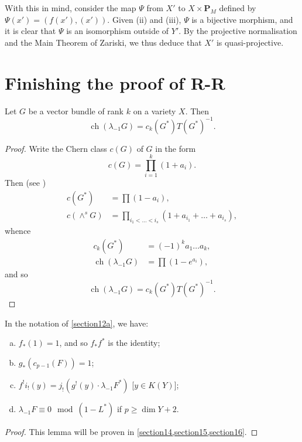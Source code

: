 \documentclass{article}
\theoremstyle{plain}
\newenvironment{lemma}[1]
    {\renewcommand\theinnercustomlemma{#1}\innercustomlemma}
    {\endinnercustomlemma}
\theoremstyle{definition}
\newcommand{\PP}{\mathbf{P}}
\renewcommand{\geq}{\geqslant}
\DeclareMathOperator{\ch}{ch}
\begin{document}
With this in mind, consider the map $\Psi$ from $X'$ to $X\times\PP_M$ defined by $\Psi(x')=(f(x'),(x'))$.
Given (ii) and (iii), $\Psi$ is a bijective morphism, and it is clear that $\Psi$ is an isomorphism outside of $Y'$.
By the projective normalisation and the Main Theorem of Zariski, we thus deduce that $X'$ is quasi-projective.


\section{Finishing the proof of R-R}
\label{section13}

\begin{lemma}{18}
\label{lemma18}
  Let $G$ be a vector bundle of rank $k$ on a variety $X$.
  Then
  \[
    \ch(\lambda_{-1}G) = c_k(G^*)T(G^*)^{-1}.
  \]
\end{lemma}

\begin{proof}
  Write the Chern class $c(G)$ of $G$ in the form
  \[
    c(G) = \prod_{i=1}^k (1+a_i).
  \]
  Then (see \cite{9})
  \begin{align*}
    c(G^*) &= \prod (1-a_i),
  \\c(\wedge^sG) &= \prod_{i_1<\ldots<i_s} (1+a_{i_1}+\ldots+a_{i_s}),
  \end{align*}
  whence
  \begin{align*}
    c_k(G^*) &= (-1)^k a_1\ldots a_k,
  \\\ch(\lambda_{-1}G) &= \prod (1-e^{a_i}),
  \end{align*}
  and so
  \[
    \ch(\lambda_{-1}G) = c_k(G^*)T(G^*)^{-1}.
  \]
\end{proof}

\begin{lemma}{19}
\label{lemma19}
  In the notation of \cref{section12a}, we have:
  \begin{enumerate}[(a)]
    \item $f_*(1) = 1$, and so $f_*f^*$ is the identity;
    \item $g_*(c_{p-1}(F)) = 1$;
    \item $f^!i_!(y) = j_!(g^!(y)\cdot\lambda_{-1}F^*)$ [$y\in K(Y)$];
    \item $\lambda_{-1}F\equiv0 \mod(1-L^*)$ if $p\geq\dim Y+2$.
  \end{enumerate}
\end{lemma}

\begin{proof}
  This lemma will be proven in \cref{section14,section15,section16}.
\end{proof}
\end{document}
